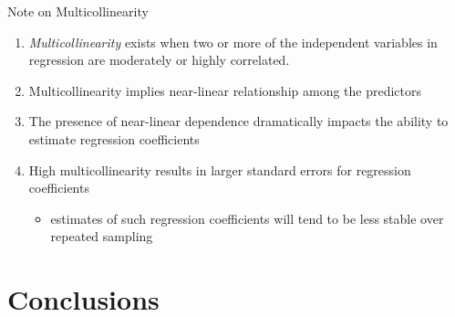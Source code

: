 \documentclass[ignorenonframetext,]{beamer}
\providecommand{\tightlist}{%
  \setlength{\itemsep}{0pt}\setlength{\parskip}{0pt}}
\begin{document}
\begin{frame}{Note on Multicollinearity}
\protect\hypertarget{note-on-multicollinearity}{}

\begin{enumerate}
\tightlist
\item
  \emph{Multicollinearity} exists when two or more of the independent
  variables in regression are moderately or highly correlated.
\item
  Multicollinearity implies near-linear relationship among the
  predictors
\item
  The presence of near-linear dependence dramatically impacts the
  ability to estimate regression coefficients
\item
  High multicollinearity results in larger standard errors for
  regression coefficients

  \begin{itemize}
  \tightlist
  \item
    estimates of such regression coefficients will tend to be less
    stable over repeated sampling
  \end{itemize}
\end{enumerate}

\end{frame}

\hypertarget{conclusions}{%
\section{Conclusions}\label{conclusions}}
\end{document}
